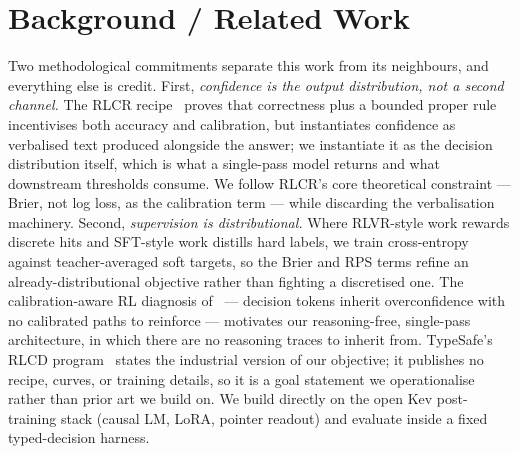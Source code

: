 \documentclass{article}
\begin{document}
\section{Background / Related Work}

Two methodological commitments separate this work from its neighbours, and
everything else is credit. First, \emph{confidence is the output
distribution, not a second channel.} The RLCR recipe~\cite{damani2025rlcr}
proves that correctness plus a bounded proper rule incentivises both
accuracy and calibration, but instantiates confidence as verbalised text
produced alongside the answer; we instantiate it as the decision
distribution itself, which is what a single-pass model returns and what
downstream thresholds consume. We follow RLCR's core theoretical
constraint — Brier, not log loss, as the calibration term — while
discarding the verbalisation machinery. Second, \emph{supervision is
distributional.} Where RLVR-style work rewards discrete hits and
SFT-style work distills hard labels, we train cross-entropy against
teacher-averaged soft targets, so the Brier and RPS terms refine an
already-distributional objective rather than fighting a discretised one.
The calibration-aware RL diagnosis of~\cite{yaldiz2026calibration} —
decision tokens inherit overconfidence with no calibrated paths to
reinforce — motivates our reasoning-free, single-pass architecture, in
which there are no reasoning traces to inherit from. TypeSafe's
RLCD program~\cite{typesafe2026rlcd} states the industrial version of our
objective; it publishes no recipe, curves, or training details, so it is a
goal statement we operationalise rather than prior art we build on. We
build directly on the open Kev post-training stack (causal LM, LoRA,
pointer readout) and evaluate inside a fixed typed-decision harness.
\end{document}
